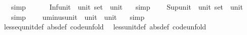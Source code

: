 \begin{isabellebody}
\ \ \ {\isacharbrackleft}{\kern0pt}simp{\isacharbrackright}{\kern0pt}{\isacharcolon}{\kern0pt}\ {\isachardoublequoteopen}{\isacharunderscore}{\kern0pt}\ {\isasymsqunion}\ {\isacharunderscore}{\kern0pt}\ {\isacharequal}{\kern0pt}\ {\isacharparenleft}{\kern0pt}{\isacharparenright}{\kern0pt}{\isachardoublequoteclose}\isanewline
\isanewline
{}\isamarkupfalse%
\ Inf{\isacharunderscore}{\kern0pt}unit\ {\isacharcolon}{\kern0pt}{\isacharcolon}{\kern0pt}\ {\isachardoublequoteopen}unit\ set\ {\isasymRightarrow}\ unit{\isachardoublequoteclose}\isanewline
\ \ \ {\isacharbrackleft}{\kern0pt}simp{\isacharbrackright}{\kern0pt}{\isacharcolon}{\kern0pt}\ {\isachardoublequoteopen}{\isasymSqinter}{\isacharunderscore}{\kern0pt}\ {\isacharequal}{\kern0pt}\ {\isacharparenleft}{\kern0pt}{\isacharparenright}{\kern0pt}{\isachardoublequoteclose}\isanewline
\isanewline
{}\isamarkupfalse%
\ Sup{\isacharunderscore}{\kern0pt}unit\ {\isacharcolon}{\kern0pt}{\isacharcolon}{\kern0pt}\ {\isachardoublequoteopen}unit\ set\ {\isasymRightarrow}\ unit{\isachardoublequoteclose}\isanewline
\ \ \ {\isacharbrackleft}{\kern0pt}simp{\isacharbrackright}{\kern0pt}{\isacharcolon}{\kern0pt}\ {\isachardoublequoteopen}{\isasymSqunion}{\isacharunderscore}{\kern0pt}\ {\isacharequal}{\kern0pt}\ {\isacharparenleft}{\kern0pt}{\isacharparenright}{\kern0pt}{\isachardoublequoteclose}\isanewline
\isanewline
{}\isamarkupfalse%
\ uminus{\isacharunderscore}{\kern0pt}unit\ {\isacharcolon}{\kern0pt}{\isacharcolon}{\kern0pt}\ {\isachardoublequoteopen}unit\ {\isasymRightarrow}\ unit{\isachardoublequoteclose}\isanewline
\ \ \ {\isacharbrackleft}{\kern0pt}simp{\isacharbrackright}{\kern0pt}{\isacharcolon}{\kern0pt}\ {\isachardoublequoteopen}{\isacharminus}{\kern0pt}\ {\isacharunderscore}{\kern0pt}\ {\isacharequal}{\kern0pt}\ {\isacharparenleft}{\kern0pt}{\isacharparenright}{\kern0pt}{\isachardoublequoteclose}\isanewline
\isanewline
{}\isamarkupfalse%
\ less{\isacharunderscore}{\kern0pt}eq{\isacharunderscore}{\kern0pt}unit{\isacharunderscore}{\kern0pt}def\ {\isacharbrackleft}{\kern0pt}abs{\isacharunderscore}{\kern0pt}def{\isacharcomma}{\kern0pt}\ code{\isacharunderscore}{\kern0pt}unfold{\isacharbrackright}{\kern0pt}\isanewline
\ \ less{\isacharunderscore}{\kern0pt}unit{\isacharunderscore}{\kern0pt}def\ {\isacharbrackleft}{\kern0pt}abs{\isacharunderscore}{\kern0pt}def{\isacharcomma}{\kern0pt}\ code{\isacharunderscore}{\kern0pt}unfold{\isacharbrackright}{\kern0pt}\isanewline

\end{isabellebody}
